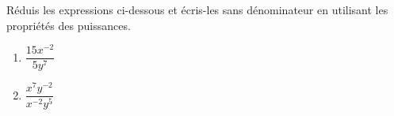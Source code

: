 %
%
    Réduis les expressions ci-dessous  et écris-les sans dénominateur en utilisant les propriétés des puissances.
    \begin{enumerate}[cols=2]
        \item $\dfrac{15x^{-2}}{5y^7}$
        \item $\dfrac{x^7 y^{-2}}{x^{-2}y^5}$
    \end{enumerate}
